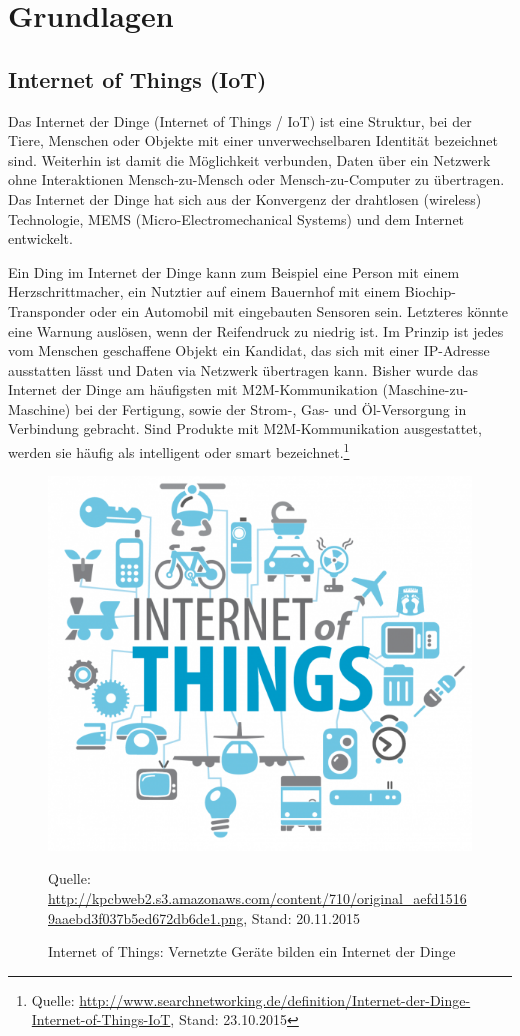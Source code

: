 \chapter{Grundlagen}
\section{Internet of Things (IoT)}
Das Internet der Dinge (Internet of Things / IoT) ist eine Struktur, bei der Tiere, Menschen oder Objekte mit einer unverwechselbaren  Identität bezeichnet sind. Weiterhin ist damit die Möglichkeit verbunden, Daten über ein Netzwerk ohne Interaktionen Mensch-zu-Mensch oder Mensch-zu-Computer zu übertragen. Das Internet der Dinge hat sich aus der Konvergenz der drahtlosen (wireless) Technologie, MEMS (Micro-Electromechanical Systems) und dem Internet entwickelt.

Ein Ding im Internet der Dinge kann zum Beispiel eine Person mit einem Herzschrittmacher, ein Nutztier auf einem Bauernhof mit einem Biochip-Transponder oder ein Automobil mit eingebauten Sensoren sein. Letzteres könnte eine Warnung auslösen, wenn der Reifendruck zu niedrig ist. Im Prinzip ist jedes vom Menschen geschaffene Objekt ein Kandidat, das sich mit einer IP-Adresse ausstatten lässt und Daten via Netzwerk übertragen kann. Bisher wurde das Internet der Dinge am häufigsten mit M2M-Kommunikation (Maschine-zu-Maschine) bei der Fertigung, sowie der Strom-, Gas- und Öl-Versorgung in Verbindung gebracht. Sind Produkte mit M2M-Kommunikation ausgestattet, werden sie häufig als intelligent oder smart bezeichnet.\footnote{Quelle: \url{http://www.searchnetworking.de/definition/Internet-der-Dinge-Internet-of-Things-IoT}, Stand: 23.10.2015}
\begin{figure}[h]
  \centering
  \includegraphics[scale=0.5]{98_Bilder/02_Grundlagen/iot}
  \caption[Symbolbild Internet of Things]{Internet of Things: Vernetzte Geräte bilden ein Internet der Dinge}
  \footnotesize Quelle: \url{http://kpcbweb2.s3.amazonaws.com/content/710/original_aefd15169aaebd3f037b5ed672db6de1.png}, Stand: 20.11.2015
\end{figure}


